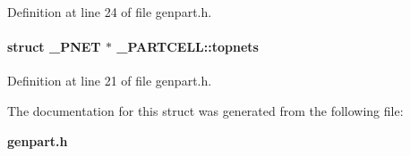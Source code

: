 Definition at line 24 of file genpart.h.\label{_PARTCELL_m4}
\paragraph{\setlength{\rightskip}{0pt plus 5cm}struct {\bf \_\-PNET} $\ast$ \_\-PARTCELL::topnets}\hfill



Definition at line 21 of file genpart.h.

The documentation for this struct was generated from the following file:\begin{CompactItemize}
\item 
{\bf genpart.h}\end{CompactItemize}
